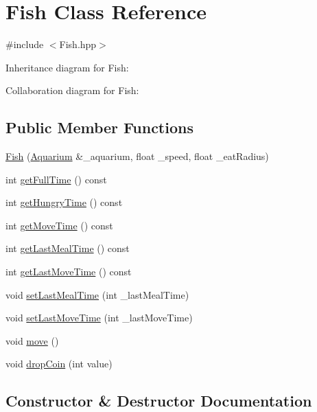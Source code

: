 \hypertarget{class_fish}{}\section{Fish Class Reference}
\label{class_fish}


{\ttfamily \#include $<$Fish.\+hpp$>$}



Inheritance diagram for Fish\+:


Collaboration diagram for Fish\+:
\subsection*{Public Member Functions}
\begin{DoxyCompactItemize}
\item 
\mbox{\hyperlink{class_fish_aede64f7ce29fcda26276bb24a5aa509d}{Fish}} (\mbox{\hyperlink{class_aquarium}{Aquarium}} \&\+\_\+aquarium, float \+\_\+speed, float \+\_\+eat\+Radius)
\item 
int \mbox{\hyperlink{class_fish_aad3fb1122b2fbb928f854d73726aa234}{get\+Full\+Time}} () const
\item 
int \mbox{\hyperlink{class_fish_abcd4464c7dce28026fe2738b75576875}{get\+Hungry\+Time}} () const
\item 
int \mbox{\hyperlink{class_fish_a3a337242dce822aeb5a0e063d7b99e39}{get\+Move\+Time}} () const
\item 
int \mbox{\hyperlink{class_fish_a078c712871cc4e9f7d3ed98a6c95f12e}{get\+Last\+Meal\+Time}} () const
\item 
int \mbox{\hyperlink{class_fish_a4ddf35ce18487be8976ba505e50693b2}{get\+Last\+Move\+Time}} () const
\item 
void \mbox{\hyperlink{class_fish_a1f7311b9420fb5024765db52bcdb6cf3}{set\+Last\+Meal\+Time}} (int \+\_\+last\+Meal\+Time)
\item 
void \mbox{\hyperlink{class_fish_a49b56a52b365b3b492e519e4b27bc441}{set\+Last\+Move\+Time}} (int \+\_\+last\+Move\+Time)
\item 
void \mbox{\hyperlink{class_fish_a1a18368573aab3b14a83aaf2424630ec}{move}} ()
\item 
void \mbox{\hyperlink{class_fish_add7c1e5a1f01384f3e5d919d880941bd}{drop\+Coin}} (int value)
\end{DoxyCompactItemize}


\subsection{Constructor \& Destructor Documentation}
\mbox{\label{class_fish_aede64f7ce29fcda26276bb24a5aa509d}} 
